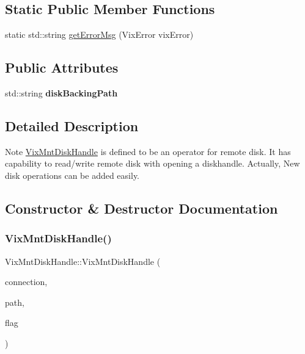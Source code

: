 \subsection*{Static Public Member Functions}
\begin{DoxyCompactItemize}
\item 
static std\+::string \hyperlink{class_vix_mnt_disk_handle_af82283b2e5ae7e90d81ed9c920998b09}{get\+Error\+Msg} (Vix\+Error vix\+Error)
\end{DoxyCompactItemize}
\subsection*{Public Attributes}
\begin{DoxyCompactItemize}
\item 
\hypertarget{class_vix_mnt_disk_handle_a49417543df05b10e0d65c738ec0909d7}{}\label{class_vix_mnt_disk_handle_a49417543df05b10e0d65c738ec0909d7} 
std\+::string {\bfseries disk\+Backing\+Path}
\end{DoxyCompactItemize}


\subsection{Detailed Description}
Note \hyperlink{class_vix_mnt_disk_handle}{Vix\+Mnt\+Disk\+Handle} is defined to be an operator for remote disk. It has capability to read/write remote disk with opening a diskhandle. Actually, New disk operations can be added easily. 

\subsection{Constructor \& Destructor Documentation}
\hypertarget{class_vix_mnt_disk_handle_a92186fd06d5467664f79b15a23453c78}{}\label{class_vix_mnt_disk_handle_a92186fd06d5467664f79b15a23453c78} 
\subsubsection{\texorpdfstring{Vix\+Mnt\+Disk\+Handle()}{VixMntDiskHandle()}}
{\ttfamily Vix\+Mnt\+Disk\+Handle\+::\+Vix\+Mnt\+Disk\+Handle (\begin{DoxyParamCaption}\item[{Vix\+Disk\+Lib\+Connection}]{connection,  }\item[{const char $\ast$}]{path,  }\item[{uint32}]{flag }\end{DoxyParamCaption})\hspace{0.3cm}{\ttfamily [explicit]}}



